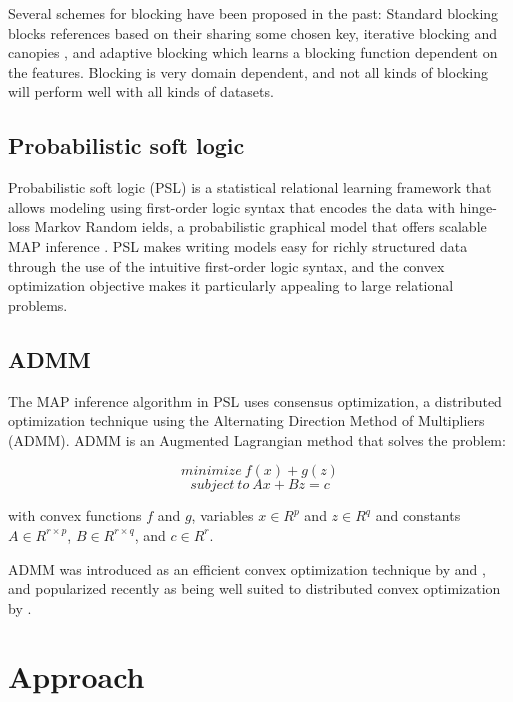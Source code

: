\documentclass{article}
\begin{document}
        Several schemes for blocking have been proposed in the past: Standard blocking \cite{jaro1989advances} blocks references based on their sharing some chosen key, iterative blocking \cite{whang2009entity} and canopies \cite{mccallum2000efficient}, and adaptive blocking \cite{bilenko2006adaptive} which learns a blocking function dependent on the features. Blocking is very domain dependent, and not all kinds of blocking will perform well with all kinds of datasets.
    
    \subsection{Probabilistic soft logic}
    
        Probabilistic soft logic (PSL) is a statistical relational learning framework that allows modeling using first-order logic syntax that encodes the data with hinge-loss Markov Random ields, a probabilistic graphical model that offers scalable MAP inference \cite{bach2015hinge}. PSL makes writing models easy for richly structured data through the use of the intuitive first-order logic syntax, and the convex optimization objective makes it particularly appealing to large relational problems.
    
    \subsection{ADMM}
   
         The MAP inference algorithm in PSL uses consensus optimization, a distributed optimization technique using the Alternating Direction Method of Multipliers (ADMM). ADMM is an Augmented Lagrangian method that solves the problem:

        $$ minimize \ f(x) + g(z) $$
        $$ subject \ to \ Ax + Bz = c $$

        with convex functions $ f $ and $ g $, variables $ x \in R^p $ and $ z \in R^q $ and constants $ A \in R^{r \times p}$, $ B \in R^{r \times q} $, and $ c \in R^r $.

        ADMM was introduced as an efficient convex optimization technique by \cite{glowinski1975approximation} and \cite{gabay1976dual}, and popularized recently as being well suited to distributed convex optimization by \cite{boyd2011distributed}.
        

\section{Approach}
    
\end{document}
